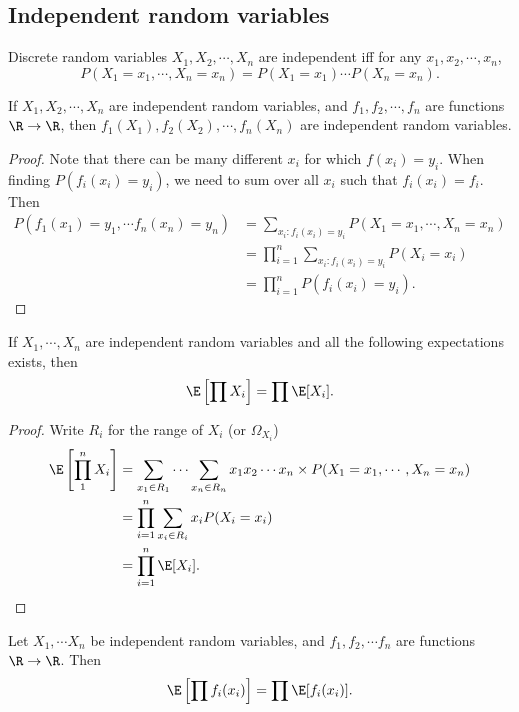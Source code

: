 \documentclass[a4paper]{article}
\begin{document}
\subsection{Independent random variables}
\begin{defi}
  Discrete random variables $X_1, X_2, \cdots, X_n$ are independent iff for any $x_1, x_2, \cdots, x_n$,
  \[
    P(X_1 = x_1, \cdots, X_n = x_n) = P(X_1 = x_1)\cdots P(X_n = x_n).
  \]
\end{defi}

\begin{thm}
  If $X_1, X_2, \cdots, X_n$ are independent random variables, and $f_1, f_2, \cdots, f_n$ are functions $\R \to \R$, then $f_1(X_1), f_2(X_2), \cdots, f_n(X_n)$ are independent random variables.
\end{thm}

\begin{proof}
  Note that there can be many different $x_i$ for which $f(x_i) = y_i$. When finding $P(f_i(x_i)= y_i)$, we need to sum over all $x_i$ such that $f_i(x_i) = f_i$. Then
  \begin{align*}
    P(f_1(x_1) = y_1, \cdots f_n(x_n) = y_n) &= \sum_{x_i: f_i(x_i) = y_i} P(X_1 = x_1, \cdots, X_n = x_n)\\
    &= \prod_{i = 1}^n \sum_{x_i:f_i(x_i) = y_i} P(X_i = x_i)\\
    &= \prod_{i = 1}^n P(f_i(x_i) = y_i).
  \end{align*}
\end{proof}

\begin{thm}
  If $X_1, \cdots, X_n$ are independent random variables and all the following expectations exists, then
  \[
    \E\left[\prod X_i\right] = \prod \E[X_i].
  \]
\end{thm}

\begin{proof}
  Write $R_i$ for the range of $X_i$ (or $\Omega_{X_i}$)
  \begin{align*}
    \E\left[\prod_1^n X_i\right] &= \sum_{x_1\in R_1}\cdots \sum_{x_n\in R_n}x_1x_2\cdots x_n\times P(X_1 = x_1, \cdots, X_n = x_n)\\
    &= \prod_{i = 1}^n \sum_{x_i \in R_i}x_iP(X_i = x_i)\\
    &= \prod_{i = 1}^n \E[X_i].
  \end{align*}
\end{proof}

\begin{cor}
  Let $X_1,\cdots X_n$ be independent random variables, and $f_1, f_2, \cdots f_n$ are functions $\R\to \R$. Then
  \[
    \E\left[\prod f_i(x_i)\right] = \prod \E[f_i(x_i)].
  \]
\end{cor}
\end{document}
